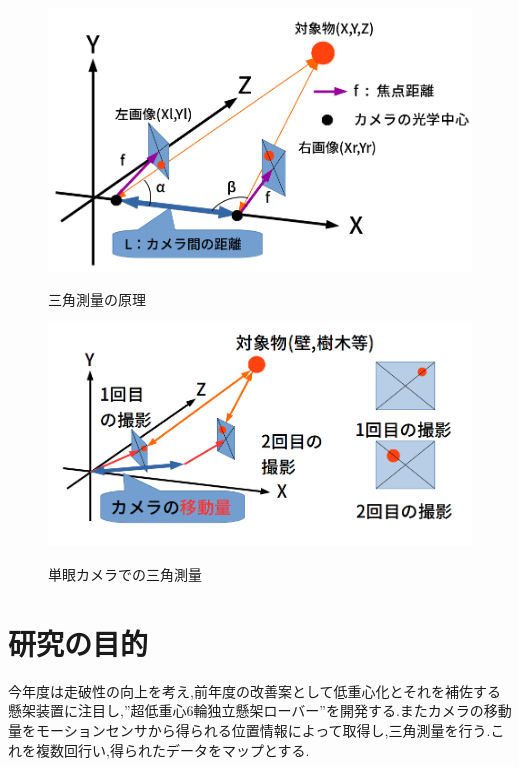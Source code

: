 \documentclass[12pt,oneside]{sotsuken_paper}
\begin{document}
\begin{figure}[htp]
 \begin{center}
  \includegraphics[width=120mm]{img/soft/sankaku1.png}
 　\caption{三角測量の原理}
  \label{fig:sankaku１}%
 \end{center}
\end{figure}


\begin{figure}[htp]
 \begin{center}
  \includegraphics[width=120mm]{img/soft/sankaku2.png}
 　\caption{単眼カメラでの三角測量}
  \label{fig:sankaku2}%
 \end{center}
\end{figure}


\section{研究の目的}
今年度は走破性の向上を考え,前年度の改善案として低重心化とそれを補佐する懸架装置に注目し,”超低重心6輪独立懸架ローバー”を開発する.またカメラの移動量をモーションセンサから得られる位置情報によって取得し,三角測量を行う.これを複数回行い,得られたデータをマップとする.
\end{document}
